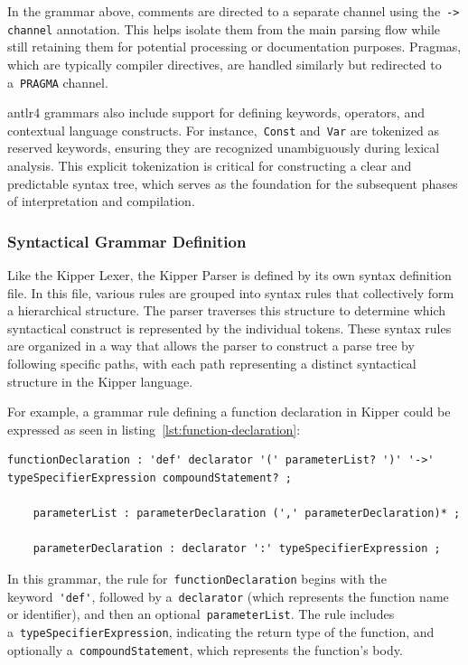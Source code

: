 In the grammar above, comments are directed to a separate channel using the~\lstinline|-> channel| annotation. This helps isolate them from the main parsing flow while still retaining them for potential processing or documentation purposes. Pragmas, which are typically compiler directives, are handled similarly but redirected to a~\lstinline|PRAGMA| channel.

\Gls{antlr4} grammars also include support for defining keywords, operators, and contextual language constructs. For instance,~\lstinline|Const| and~\lstinline|Var| are tokenized as reserved keywords, ensuring they are recognized unambiguously during lexical analysis. This explicit tokenization is critical for constructing a clear and predictable syntax tree, which serves as the foundation for the subsequent phases of interpretation and compilation.

\subsubsection{Syntactical Grammar Definition}
\label{sec:parser-grammar-definition}

Like the Kipper Lexer, the Kipper Parser is defined by its own syntax definition file. In this file, various rules are grouped into syntax rules that collectively form a hierarchical structure. The parser traverses this structure to determine which syntactical construct is represented by the individual tokens. These syntax rules are organized in a way that allows the parser to construct a parse tree by following specific paths, with each path representing a distinct syntactical structure in the Kipper language.

For example, a grammar rule defining a function declaration in Kipper could be expressed as seen in listing~\ref{lst:function-declaration}:

\begin{lstlisting}[language=antlr4, caption={Function Declaration Grammar}, label={lst:function-declaration}]
	functionDeclaration : 'def' declarator '(' parameterList? ')' '->' typeSpecifierExpression compoundStatement? ;
	
	parameterList : parameterDeclaration (',' parameterDeclaration)* ;
	
	parameterDeclaration : declarator ':' typeSpecifierExpression ;
\end{lstlisting}

In this grammar, the rule for~\lstinline|functionDeclaration| begins with the keyword~\lstinline|'def'|, followed by a~\lstinline|declarator| (which represents the function name or identifier), and then an optional~\lstinline|parameterList|. The rule includes a~\lstinline|typeSpecifierExpression|, indicating the return type of the function, and optionally a~\lstinline|compoundStatement|, which represents the function's body.

